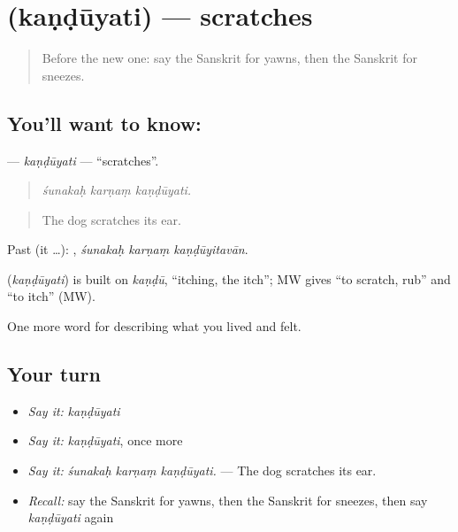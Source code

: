 \section[\texorpdfstring{\sk{कण्डूयति} (kaṇḍūyati)}{कण्डूयति (kaṇḍūyati)}]{ (kaṇḍūyati) — scratches}

\label{lesson:SA-C475-kanduyati}



\begin{quote}
Before the new one: say the Sanskrit for yawns, then the Sanskrit for sneezes.
\end{quote}

\subsection*{You'll want to know: }
\textbf{} — \emph{kaṇḍūyati} — \textquotedblleft{}scratches\textquotedblright{}.

\begin{quote}
  
\end{quote}

\begin{quote}
\emph{śunakaḥ karṇaṃ kaṇḍūyati.}
\end{quote}

\begin{quote}
The dog scratches its ear.
\end{quote}

Past (it …):   , \emph{śunakaḥ karṇaṃ kaṇḍūyitavān}.

\begin{cousinweb}
\textbf{} (\emph{kaṇḍūyati}) is built on \emph{kaṇḍū}, \textquotedblleft{}itching, the itch\textquotedblright{}; MW gives \textquotedblleft{}to scratch, rub\textquotedblright{} and \textquotedblleft{}to itch\textquotedblright{} (MW).
\end{cousinweb}

\begin{grammarlens}[title={What you've built}]
One more word for describing what you lived and felt.
\end{grammarlens}

\subsection*{Your turn}
\begin{itemize}
\raggedright
  \item \emph{Say it:} \emph{kaṇḍūyati}
  \item \emph{Say it:} \emph{kaṇḍūyati}, once more
  \item \emph{Say it:} \emph{śunakaḥ karṇaṃ kaṇḍūyati.} — The dog scratches its ear.
  \item \emph{Recall:} say the Sanskrit for yawns, then the Sanskrit for sneezes, then say \emph{kaṇḍūyati} again
\end{itemize}

